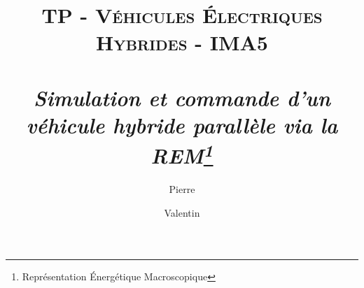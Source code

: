 \documentclass[10pt,oneside]{article}
\title{\textsc{\textbf{TP - Véhicules \'Electriques Hybrides}} - IMA5\\~\\
  \Large{\textit{Simulation et commande d'un véhicule hybride parallèle via la REM\footnote{Représentation \'Energétique Macroscopique}}}
  }
\date{}
\author{
   Pierre \bsc{Appercé}\\ \and
   Valentin \bsc{Vergez}
   }
\begin{document}
	\maketitle

	\renewcommand{\contentsname}{Table des matières}
	\tableofcontents %
	\newpage
	





	\appendix
	\addappheadtotoc




%
\end{document}
